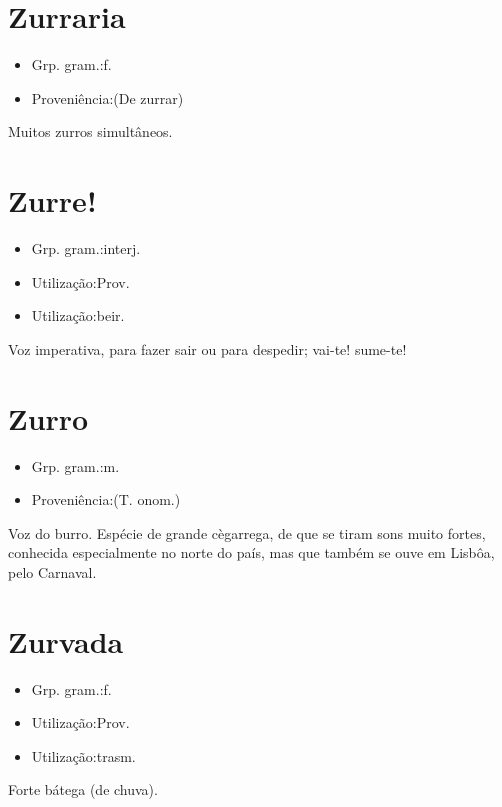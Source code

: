 \section{Zurraria}
\begin{itemize}
\item {Grp. gram.:f.}
\end{itemize}
\begin{itemize}
\item {Proveniência:(De \textunderscore zurrar\textunderscore )}
\end{itemize}
Muitos zurros simultâneos.
\section{Zurre!}
\begin{itemize}
\item {Grp. gram.:interj.}
\end{itemize}
\begin{itemize}
\item {Utilização:Prov.}
\end{itemize}
\begin{itemize}
\item {Utilização:beir.}
\end{itemize}
Voz imperativa, para fazer sair ou para despedir; vai-te! sume-te!
\section{Zurro}
\begin{itemize}
\item {Grp. gram.:m.}
\end{itemize}
\begin{itemize}
\item {Proveniência:(T. onom.)}
\end{itemize}
Voz do burro.
Espécie de grande cègarrega, de que se tiram sons muito fortes, conhecida especialmente no norte do país, mas que também se ouve em Lisbôa, pelo Carnaval.
\section{Zurvada}
\begin{itemize}
\item {Grp. gram.:f.}
\end{itemize}
\begin{itemize}
\item {Utilização:Prov.}
\end{itemize}
\begin{itemize}
\item {Utilização:trasm.}
\end{itemize}
Forte bátega (de chuva).
